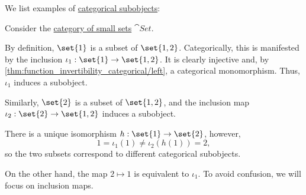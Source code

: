 \begin{example}\label{ex:def:categorical_subobject}
  We list examples of \hyperref[def:categorical_subobject]{categorical subobjects}:
  \begin{thmenum}
     Consider the \hyperref[def:category_of_small_sets]{category of small sets} \( \cat{Set} \).

    By definition, \( \set{ 1 } \) is a subset of \( \set{ 1, 2 } \). Categorically, this is manifested by the inclusion \( \iota_1: \set{ 1 } \to \set{ 1, 2 } \). It is clearly injective and, by \cref{thm:function_invertibility_categorical/left}, a categorical monomorphism. Thus, \( \iota_1 \) induces a subobject.

    Similarly, \( \set{ 2 } \) is a subset of \( \set{ 1, 2 } \), and the inclusion map \( \iota_2: \set{ 2 } \to \set{ 1, 2 } \) induces a subobject.

    There is a unique isomorphism \( h: \set{ 1 } \to \set{ 2 } \), however,
    \begin{equation*}
      1 = \iota_1(1) \neq \iota_2(h(1)) = 2,
    \end{equation*}
    so the two subsets correspond to different categorical subobjects.

    On the other hand, the map \( 2 \mapsto 1 \) is equivalent to \( \iota_1 \). To avoid confusion, we will focus on inclusion maps.
  \end{thmenum}
\end{example}

